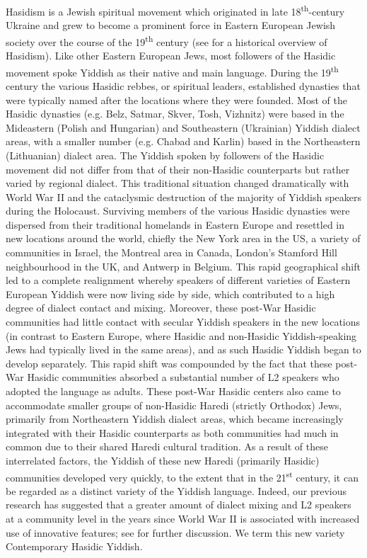 \documentclass[output=paper, hidelinks]{langscibook}
\begin{document}
Hasidism is a Jewish spiritual movement which originated in late 18\textsuperscript{th}-century Ukraine and grew to become a prominent force in Eastern European Jewish society over the course of the 19\textsuperscript{th} century (see \citealt{Biale18} for a historical overview of Hasidism). Like other Eastern European Jews, most followers of the Hasidic movement spoke Yiddish as their native and main language. During the 19\textsuperscript{th} century the various Hasidic rebbes, or spiritual leaders, established dynasties that were typically named after the locations where they were founded. Most of the Hasidic dynasties (e.g. Belz, Satmar, Skver, Tosh, Vizhnitz) were based in the Mideastern (Polish and Hungarian) and Southeastern (Ukrainian) Yiddish dialect areas, with a smaller number (e.g. Chabad and Karlin) based in the Northeastern (Lithuanian) dialect area. The Yiddish spoken by followers of the Hasidic movement did not differ from that of their non-Hasidic counterparts but rather varied by regional dialect. This traditional situation changed dramatically with World War II and the cataclysmic destruction of the majority of Yiddish speakers during the Holocaust. Surviving members of the various Hasidic dynasties were dispersed from their traditional homelands in Eastern Europe and resettled in new locations around the world, chiefly the New York area in the US, a variety of communities in Israel, the Montreal area in Canada, London’s Stamford Hill neighbourhood in the UK, and Antwerp in Belgium. This rapid geographical shift led to a complete realignment whereby speakers of different varieties of Eastern European Yiddish were now living side by side, which contributed to a high degree of dialect contact and mixing. Moreover, these post-War Hasidic communities had little contact with secular Yiddish speakers in the new locations (in contrast to Eastern Europe, where Hasidic and non-Hasidic Yiddish-speaking Jews had typically lived in the same areas), and as such Hasidic Yiddish began to develop separately. This rapid shift was compounded by the fact that these post-War Hasidic communities absorbed a substantial number of L2 speakers who adopted the language as adults. These post-War Hasidic centers also came to accommodate smaller groups of non-Hasidic Haredi (strictly Orthodox) Jews, primarily from Northeastern Yiddish dialect areas, which became increasingly integrated with their Hasidic counterparts as both communities had much in common due to their shared Haredi cultural tradition. As a result of these interrelated factors, the Yiddish of these new Haredi (primarily Hasidic) communities developed very quickly, to the extent that in the 21\textsuperscript{st} century, it can be regarded as a distinct variety of the Yiddish language. Indeed, our previous research has suggested that a greater amount of dialect mixing and L2 speakers at a community level in the years since World War II is associated with increased use of innovative features; see \citet{Author21} for further discussion. We term this new variety Contemporary Hasidic Yiddish. 
\end{document}
